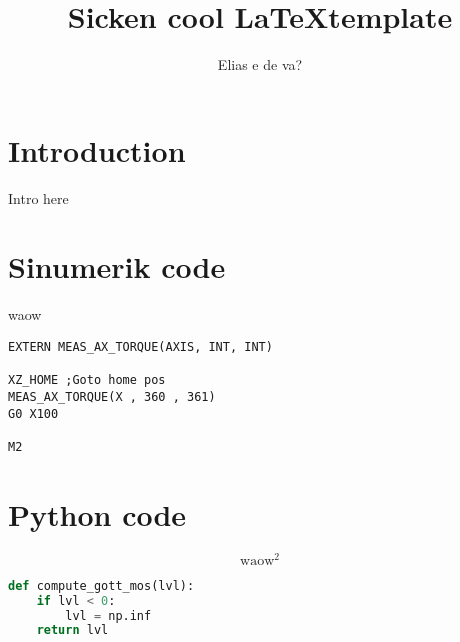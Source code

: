 

\title{Sicken cool \LaTeX template}
\author{Elias e de va?}





\section{Introduction}
Intro here

\section{Sinumerik code}
waow

\begin{lstlisting}[language=sinumerik,caption=Test-program used during test runs.]
EXTERN MEAS_AX_TORQUE(AXIS, INT, INT)

XZ_HOME ;Goto home pos
MEAS_AX_TORQUE(X , 360 , 361)
G0 X100

M2
\end{lstlisting}

\section{Python code}

\begin{equation}
\text{waow}^2
\end{equation}

\begin{lstlisting}[language=python,caption=Python 4 life <3]
def compute_gott_mos(lvl):
	if lvl < 0:
		lvl = np.inf
	return lvl


\end{lstlisting}

% 



